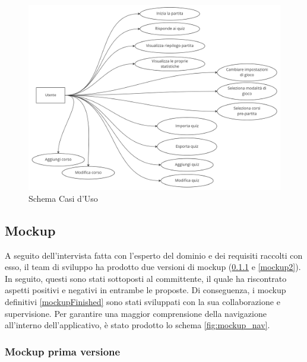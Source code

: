         \begin{figure}[H]
            \centering
            \includegraphics[width=\textwidth]{Miro/use_case.png}
            \caption{Schema Casi d'Uso}
            \label{fig:use-case}
        \end{figure}

        \subsection{Mockup}
        \label{chap:Mockup}
    	A seguito dell'intervista fatta con l'esperto del dominio e dei requisiti raccolti con esso, il team di sviluppo ha prodotto due versioni di mockup (\ref{mockup1} e \ref{mockup2}). In seguito, questi sono stati sottoposti al committente, il quale ha riscontrato aspetti positivi e negativi in entrambe le proposte. Di conseguenza, i mockup definitivi \ref{mockupFinished} sono stati sviluppati con la sua collaborazione e supervisione. Per garantire una maggior comprensione della navigazione all'interno dell'applicativo, è stato prodotto lo schema \ref{fig:mockup_nav}.
     
        \subsubsection{Mockup prima versione}\label{mockup1}
        
